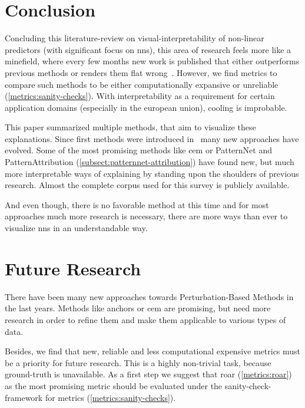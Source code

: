 \section{Conclusion}
Concluding this literature-review on visual-interpretability of non-linear predictors (with significant focus on \glspl{nn}), this area of research feels more like a minefield, where every few months new work is published that either outperforms previous methods or renders them flat wrong~\cite{Kindermans.2019,Dombrowski.2019}. However, we find metrics to compare such methods to be either computationally expansive or unreliable (\cref{metrics:sanity-checks}). With interpretability as a requirement for certain application domains (especially in the european union), cooling is improbable.
\par
This paper summarized multiple methods, that aim to visualize these explanations. Since first methods were introduced in~\cite{RobnikSikonja.2008} many new approaches have evolved. Some of the most promising methods like \gls{cem} or PatternNet and PatternAttribution (\cref{subsect:patternnet-attribution}) have found new, but much more interpretable ways of explaining by standing upon the shoulders of previous research. Almost the complete corpus used for this survey is publicly available.
\par
And even though, there is no favorable method at this time and for most approaches much more research is necessary, there are more ways than ever to visualize \glspl{nn} in an understandable way.
\section{Future Research}
There have been many new approaches towards Perturbation-Based Methods in the last years. Methods like anchors or \gls{cem} are promising, but need more research in order to refine them and make them applicable to various types of data. 
\par
Besides, we find that new, reliable and less computational expensive metrics must be a priority for future research. This is a highly non-trivial task, because ground-truth is unavailable. As a first step we suggest that \gls{roar} (\cref{metrics:roar}) as the most promising metric should be evaluated under the sanity-check-framework for metrics (\cref{metrics:sanity-checks}).